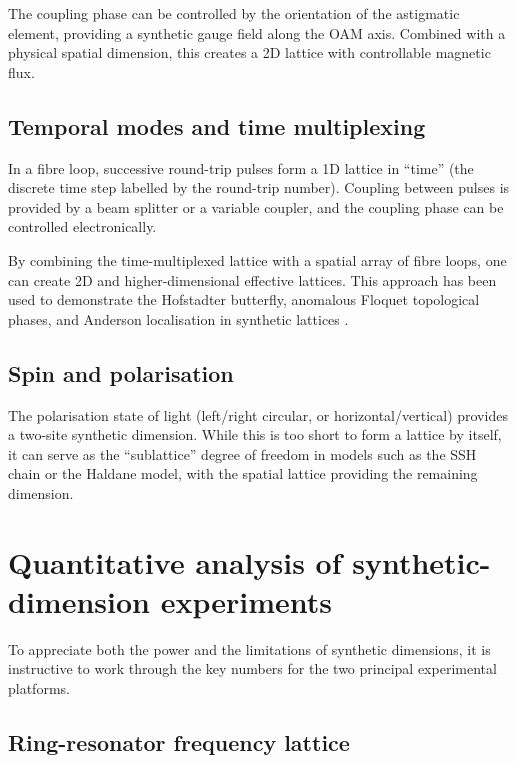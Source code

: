 The coupling phase can be controlled by the orientation of the
astigmatic element, providing a synthetic gauge field along the OAM
axis.  Combined with a physical spatial dimension, this creates a 2D
lattice with controllable magnetic flux.

\subsection{Temporal modes and time multiplexing}
\label{sec:ch16-temporal}

In a fibre loop, successive round-trip pulses form a 1D lattice in
``time'' (the discrete time step labelled by the round-trip number).
Coupling between pulses is provided by a beam splitter or a variable
coupler, and the coupling phase can be controlled electronically.

By combining the time-multiplexed lattice with a spatial array of
fibre loops, one can create 2D and higher-dimensional effective
lattices.  This approach has been used to demonstrate the
Hofstadter butterfly, anomalous Floquet topological phases, and
Anderson localisation in synthetic lattices \cite{guglielmon2017photonic}.

\subsection{Spin and polarisation}
\label{sec:ch16-spin}

The polarisation state of light (left/right circular, or
horizontal/vertical) provides a two-site synthetic dimension.  While
this is too short to form a lattice by itself, it can serve as the
``sublattice'' degree of freedom in models such as the SSH chain or the
Haldane model, with the spatial lattice providing the remaining
dimension.

\section{Quantitative analysis of synthetic-dimension experiments}
\label{sec:ch16-quantitative}

To appreciate both the power and the limitations of synthetic
dimensions, it is instructive to work through the key numbers for the
two principal experimental platforms.

\subsection{Ring-resonator frequency lattice}
\label{sec:ch16-ring-numbers}

